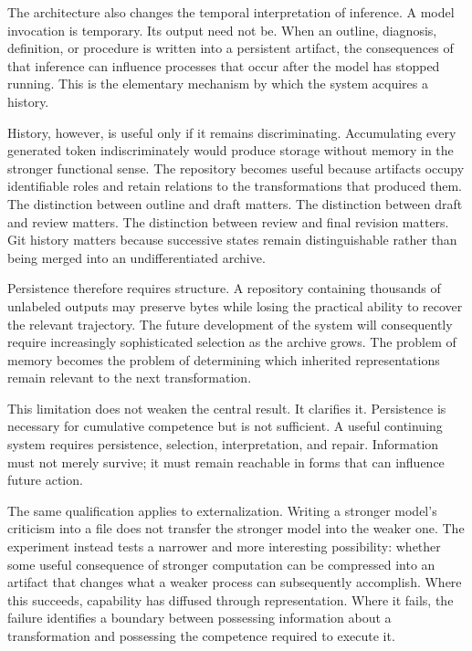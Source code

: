 \documentclass[11pt]{article}
\begin{document}
The architecture also changes the temporal interpretation of inference. A model invocation is temporary. Its output need not be. When an outline, diagnosis, definition, or procedure is written into a persistent artifact, the consequences of that inference can influence processes that occur after the model has stopped running. This is the elementary mechanism by which the system acquires a history.

History, however, is useful only if it remains discriminating. Accumulating every generated token indiscriminately would produce storage without memory in the stronger functional sense. The repository becomes useful because artifacts occupy identifiable roles and retain relations to the transformations that produced them. The distinction between outline and draft matters. The distinction between draft and review matters. The distinction between review and final revision matters. Git history matters because successive states remain distinguishable rather than being merged into an undifferentiated archive.

Persistence therefore requires structure. A repository containing thousands of unlabeled outputs may preserve bytes while losing the practical ability to recover the relevant trajectory. The future development of the system will consequently require increasingly sophisticated selection as the archive grows. The problem of memory becomes the problem of determining which inherited representations remain relevant to the next transformation.

This limitation does not weaken the central result. It clarifies it. Persistence is necessary for cumulative competence but is not sufficient. A useful continuing system requires persistence, selection, interpretation, and repair. Information must not merely survive; it must remain reachable in forms that can influence future action.

The same qualification applies to externalization. Writing a stronger model's criticism into a file does not transfer the stronger model into the weaker one. The experiment instead tests a narrower and more interesting possibility: whether some useful consequence of stronger computation can be compressed into an artifact that changes what a weaker process can subsequently accomplish. Where this succeeds, capability has diffused through representation. Where it fails, the failure identifies a boundary between possessing information about a transformation and possessing the competence required to execute it.
\end{document}
